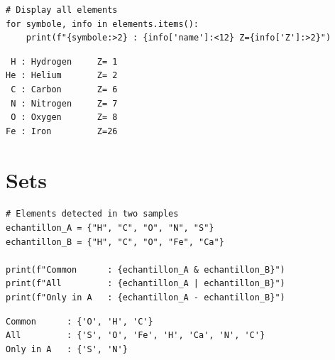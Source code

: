 \begin{codeblock}[title=\textbf{Python}]
\begin{verbatim}
# Display all elements
for symbole, info in elements.items():
    print(f"{symbole:>2} : {info['name']:<12} Z={info['Z']:>2}")
\end{verbatim}
\end{codeblock}

\begin{codeoutput}
\begin{verbatim}
 H : Hydrogen     Z= 1
He : Helium       Z= 2
 C : Carbon       Z= 6
 N : Nitrogen     Z= 7
 O : Oxygen       Z= 8
Fe : Iron         Z=26
\end{verbatim}
\end{codeoutput}

\section{Sets}

\begin{codeblock}[title=\textbf{Python}]
\begin{verbatim}
# Elements detected in two samples
echantillon_A = {"H", "C", "O", "N", "S"}
echantillon_B = {"H", "C", "O", "Fe", "Ca"}

print(f"Common      : {echantillon_A & echantillon_B}")
print(f"All         : {echantillon_A | echantillon_B}")
print(f"Only in A   : {echantillon_A - echantillon_B}")
\end{verbatim}
\end{codeblock}

\begin{codeoutput}
\begin{verbatim}
Common      : {'O', 'H', 'C'}
All         : {'S', 'O', 'Fe', 'H', 'Ca', 'N', 'C'}
Only in A   : {'S', 'N'}
\end{verbatim}
\end{codeoutput}

